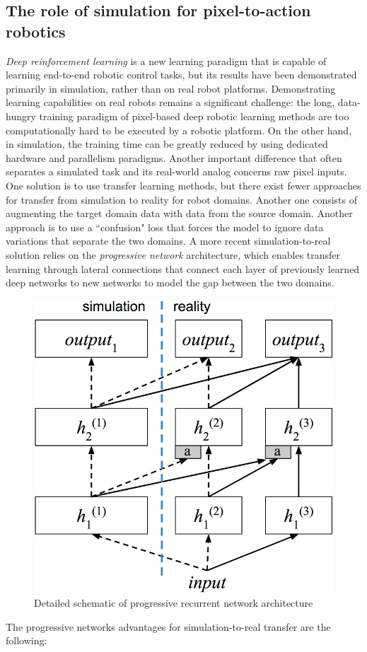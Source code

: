 \subsection{The role of simulation for pixel-to-action
robotics}\label{header-n43}

\emph{Deep reinforcement learning} is a new learning paradigm that is
capable of learning end-to-end robotic control tasks, but its results
have been demonstrated primarily in simulation, rather than on real
robot platforms. Demonstrating learning capabilities on real robots
remains a significant challenge: the long, data-hungry training paradigm
of pixel-based deep robotic learning methods are too computationally
hard to be executed by a robotic platform. On the other hand, in
simulation, the training time can be greatly reduced by using dedicated
hardware and parallelism paradigms. Another important difference that
often separates a simulated task and its real-world analog concerns raw
pixel inputs. One solution is to use transfer learning methods, but
there exist fewer approaches for transfer from simulation to reality for
robot domains. Another one consists of augmenting the target
domain data with data from the source domain. Another approach is to use
a ``confusion" loss that forces the model to ignore data variations that
separate the two domains. A more recent simulation-to-real solution
relies on the \emph{progressive network} architecture, which enables
transfer learning through lateral connections that connect each layer of
previously learned deep networks to new networks to model the gap
between the two domains. 
\begin{figure}[h!]
	\centering
	\includegraphics[width=0.5\linewidth]{images/progressivenets.jpeg}
	\caption{Detailed schematic of progressive recurrent network architecture}
\end{figure}

The progressive networks advantages for
simulation-to-real transfer are the following:

